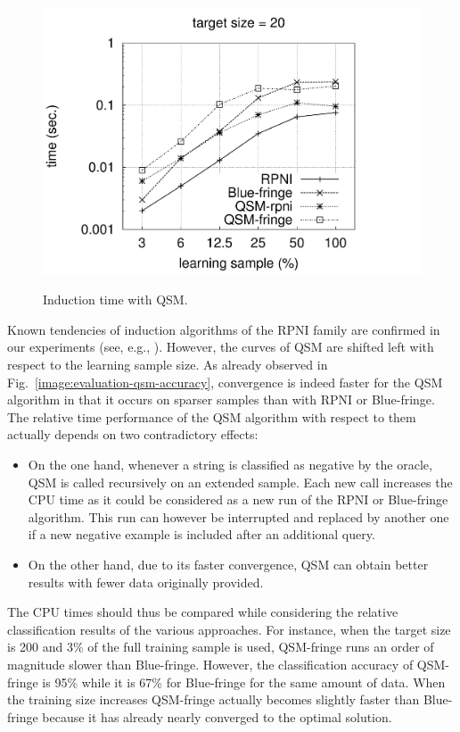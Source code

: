 \begin{figure}[t]
{  \includegraphics[trim=30mm 0mm 35mm 0mm, clip, page=4]{src/5-evaluation/images/time}
}
\caption{Induction time with QSM\label{image:evaluation-qsm-time}.}
\end{figure}

Known tendencies of induction algorithms of the RPNI family are confirmed in our experiments (see, e.g., \cite{Lang:1998}). However, the curves of QSM are shifted left with respect to the learning sample size. As already observed in Fig.~\ref{image:evaluation-qsm-accuracy}, convergence is indeed faster for the QSM algorithm in that it occurs on sparser samples than with RPNI or Blue-fringe. The relative time performance of the QSM algorithm with respect to them actually depends on two contradictory effects:
\begin{itemize}
\item On the one hand, whenever a string is classified as negative by the oracle, QSM is called recursively on an extended sample. Each new call increases the CPU time as it could be considered as a new run of the RPNI or Blue-fringe algorithm. This run can however be interrupted and replaced by another one if a new negative example is included after an additional query.
\item On the other hand, due to its faster convergence, QSM can obtain better results with fewer data originally provided. 
\end{itemize}
 
The CPU times should thus be compared while considering the relative classification results of the various approaches. For instance, when the target size is 200 and 3\% of the full training sample is used, QSM-fringe runs an order of magnitude slower than Blue-fringe. However, the classification accuracy of QSM-fringe is 95\% while it is 67\% for Blue-fringe for the same amount of data. When the training size increases QSM-fringe actually becomes slightly faster than Blue-fringe because it has already nearly converged to the optimal solution.

